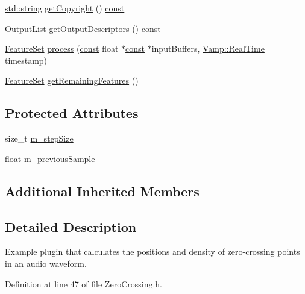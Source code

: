 \begin{DoxyCompactItemize}
\item 
\hyperlink{test__lib_f_l_a_c_2format_8c_ab02026ad0de9fb6c1b4233deb0a00c75}{std\+::string} \hyperlink{class_zero_crossing_af9c41b92aa8ff8bddaebf75569ff789c}{get\+Copyright} () \hyperlink{getopt1_8c_a2c212835823e3c54a8ab6d95c652660e}{const} 
\item 
\hyperlink{class_vamp_1_1_plugin_a30f531b8fb69fac41a24e3d2a6a08ed9}{Output\+List} \hyperlink{class_zero_crossing_ac9d590a6feb1fc9a37d7892aefe2b688}{get\+Output\+Descriptors} () \hyperlink{getopt1_8c_a2c212835823e3c54a8ab6d95c652660e}{const} 
\item 
\hyperlink{class_vamp_1_1_plugin_a448fb57dc245d47923ec9eeaf9856c5f}{Feature\+Set} \hyperlink{class_zero_crossing_abf4aaa6fd8cc03de63f4e1e8942633da}{process} (\hyperlink{getopt1_8c_a2c212835823e3c54a8ab6d95c652660e}{const} float $\ast$\hyperlink{getopt1_8c_a2c212835823e3c54a8ab6d95c652660e}{const} $\ast$input\+Buffers, \hyperlink{struct_vamp_1_1_real_time}{Vamp\+::\+Real\+Time} timestamp)
\item 
\hyperlink{class_vamp_1_1_plugin_a448fb57dc245d47923ec9eeaf9856c5f}{Feature\+Set} \hyperlink{class_zero_crossing_a70996d1b7166e303903daf92a9a37ad8}{get\+Remaining\+Features} ()
\end{DoxyCompactItemize}
\subsection*{Protected Attributes}
\begin{DoxyCompactItemize}
\item 
size\+\_\+t \hyperlink{class_zero_crossing_a584f100b87c78f9af9da040d79567d52}{m\+\_\+step\+Size}
\item 
float \hyperlink{class_zero_crossing_a0f2d9f2cab0a8a30344e1f2c0ebb8ee8}{m\+\_\+previous\+Sample}
\end{DoxyCompactItemize}
\subsection*{Additional Inherited Members}


\subsection{Detailed Description}
Example plugin that calculates the positions and density of zero-\/crossing points in an audio waveform. 

Definition at line 47 of file Zero\+Crossing.\+h.



